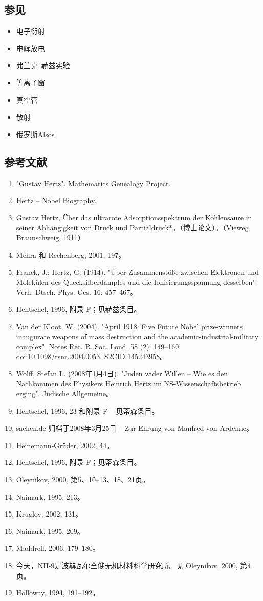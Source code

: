 \subsection{参见}
\begin{itemize}
\item 电子衍射
\item 电辉放电
\item 弗兰克–赫兹实验
\item 等离子窗
\item 真空管
\item 散射
\item 俄罗斯Alsos
\end{itemize}
\subsection{参考文献}
\begin{enumerate}
\item "Gustav Hertz". Mathematics Genealogy Project.
\item Hertz – Nobel Biography.
\item Gustav Hertz, Über das ultrarote Adsorptionsspektrum der Kohlensäure in seiner Abhängigkeit von Druck und Partialdruck*。（博士论文）。（Vieweg Braunschweig, 1911）
\item Mehra 和 Rechenberg, 2001, 197。
\item Franck, J.; Hertz, G. (1914). "Über Zusammenstöße zwischen Elektronen und Molekülen des Quecksilberdampfes und die Ionisierungsspannung desselben". Verh. Dtsch. Phys. Ges. 16: 457–467。
\item Hentschel, 1996, 附录 F；见赫兹条目。
\item Van der Kloot, W. (2004). "April 1918: Five Future Nobel prize-winners inaugurate weapons of mass destruction and the academic-industrial-military complex". Notes Rec. R. Soc. Lond. 58 (2): 149–160. doi:10.1098/rsnr.2004.0053. S2CID 145243958。
\item Wolff, Stefan L. (2008年1月4日). "Juden wider Willen – Wie es den Nachkommen des Physikers Heinrich Hertz im NS-Wissenschaftsbetrieb erging". Jüdische Allgemeine。
\item Hentschel, 1996, 23 和附录 F – 见蒂森条目。
\item sachen.de 归档于2008年3月25日 – Zur Ehrung von Manfred von Ardenne。
\item Heinemann-Grüder, 2002, 44。
\item Hentschel, 1996, 附录 F；见蒂森条目。
\item Oleynikov, 2000, 第5、10–13、18、21页。
\item Naimark, 1995, 213。
\item Kruglov, 2002, 131。
\item Naimark, 1995, 209。
\item Maddrell, 2006, 179–180。
\item 今天，NII-9是波赫瓦尔全俄无机材料科学研究所。见 Oleynikov, 2000, 第4页。
\item Holloway, 1994, 191–192。
\end{enumerate}
